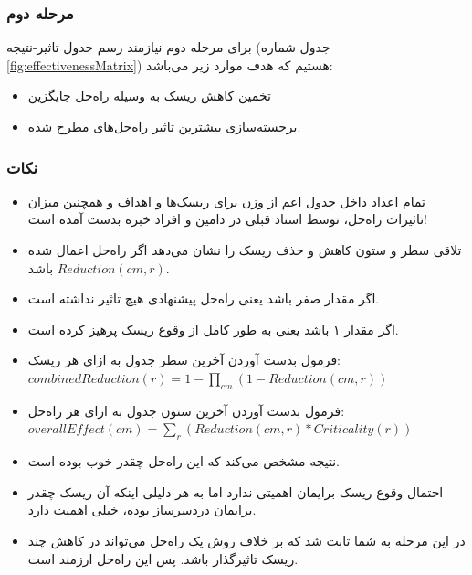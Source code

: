 \subsubsection{مرحله دوم }

برای مرحله دوم نیازمند رسم جدول تاثیر-نتیجه (جدول شماره
\ref{fig:effectivenessMatrix}) هستیم که هدف موارد زیر می‌باشد:

\begin{itemize}
    \item تخمین کاهش ریسک به وسیله راه‌حل جایگزین
    \item برجسته‌سازی بیشترین تاثیر راه‌حل‌های مطرح شده.
\end{itemize}

\subsubsection*{نکات}

\begin{itemize}
    \item تمام اعداد داخل جدول اعم از وزن‌ برای ریسک‌ها و اهداف و همچنین میزان
    تاثیرات راه‌حل، توسط اسناد قبلی در دامین و افراد خبره بدست آمده است!
\end{itemize}

\begin{itemize}
    \item تلاقی سطر و ستون کاهش و حذف ریسک را نشان می‌دهد اگر راه‌حل اعمال شده
    باشد $Reduction(cm, r)$.
    \item اگر مقدار صفر باشد یعنی راه‌حل پیشنهادی هیچ تاثیر نداشته است.
    \item اگر مقدار ۱ باشد یعنی به طور کامل از وقوع ریسک پرهیز کرده است.
    \item فرمول بدست آوردن آخرین سطر جدول به ازای هر ریسک: $combinedReduction(r) = 1 - \prod_{cm}(1 - Reduction(cm, r))$
    \item فرمول بدست آوردن آخرین ستون جدول به ازای هر راه‌حل: $overallEffect(cm) = \sum_{r}(Reduction(cm, r) * Criticality(r))$
    \item نتیجه  مشخص می‌کند که این راه‌حل
    چقدر خوب بوده است.
    \item احتمال وقوع ریسک برایمان اهمیتی ندارد اما به هر دلیلی اینکه آن ریسک
    چقدر برایمان دردسرساز بوده، خیلی اهمیت دارد.
    \item در این مرحله به شما ثابت شد که بر خلاف روش  یک راه‌حل می‌تواند
    در کاهش چند ریسک تاثیرگذار باشد. پس این راه‌حل ارزمند است.
\end{itemize}

